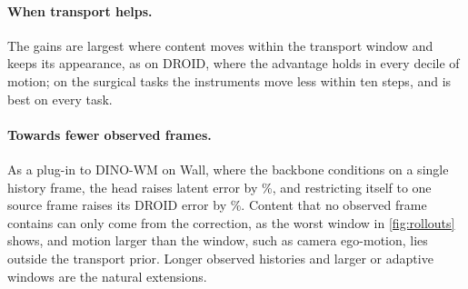 \paragraph{When transport helps.} The gains are largest where content moves within the transport window and keeps its
appearance, as on DROID, where the advantage holds in every decile of motion; on the surgical tasks the instruments move
less within ten steps, and \ours{} is best on every task.

\paragraph{Towards fewer observed frames.} As a plug-in to DINO-WM on Wall, where the backbone conditions on a single
history frame, the head raises latent error by \dinowmWallErrInc\%, and restricting \ours{} itself to one source frame
raises its DROID error by \ablsone\%.
%
Content that no observed frame contains can only come from the correction, as the worst window in \cref{fig:rollouts}
shows, and motion larger than the window, such as camera ego-motion, lies outside the transport prior.
%
Longer observed histories and larger or adaptive windows are the natural extensions.

